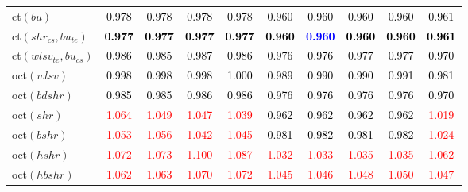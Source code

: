 \begin{tabular}[t]{>{\centering\arraybackslash}m{2.5cm}ccccccccc}
ct$(bu)$ & \textcolor{black}{0.978} & \textcolor{black}{0.978} & \textcolor{black}{0.978} & \textcolor{black}{0.978} & \textcolor{black}{0.960} & \textcolor{black}{0.960} & \textcolor{black}{0.960} & \textcolor{black}{0.960} & \textcolor{black}{0.961}\\
ct$(shr_{cs}, bu_{te})$ & \textcolor{black}{\textbf{0.977}} & \textcolor{black}{\textbf{0.977}} & \textcolor{black}{\textbf{0.977}} & \textcolor{black}{\textbf{0.977}} & \textcolor{black}{\textbf{0.960}} & \textcolor{blue}{\textbf{0.960}} & \textcolor{black}{\textbf{0.960}} & \textcolor{black}{\textbf{0.960}} & \textcolor{black}{\textbf{0.961}}\\
ct$(wlsv_{te}, bu_{cs})$ & \textcolor{black}{0.986} & \textcolor{black}{0.985} & \textcolor{black}{0.987} & \textcolor{black}{0.986} & \textcolor{black}{0.976} & \textcolor{black}{0.976} & \textcolor{black}{0.977} & \textcolor{black}{0.977} & \textcolor{black}{0.970}\\
oct$(wlsv)$ & \textcolor{black}{0.998} & \textcolor{black}{0.998} & \textcolor{black}{0.998} & \textcolor{black}{1.000} & \textcolor{black}{0.989} & \textcolor{black}{0.990} & \textcolor{black}{0.990} & \textcolor{black}{0.991} & \textcolor{black}{0.981}\\
oct$(bdshr)$ & \textcolor{black}{0.985} & \textcolor{black}{0.985} & \textcolor{black}{0.986} & \textcolor{black}{0.986} & \textcolor{black}{0.976} & \textcolor{black}{0.976} & \textcolor{black}{0.976} & \textcolor{black}{0.976} & \textcolor{black}{0.970}\\
oct$(shr)$ & \textcolor{red}{1.064} & \textcolor{red}{1.049} & \textcolor{red}{1.047} & \textcolor{red}{1.039} & \textcolor{black}{0.962} & \textcolor{black}{0.962} & \textcolor{black}{0.962} & \textcolor{black}{0.962} & \textcolor{red}{1.019}\\
oct$(bshr)$ & \textcolor{red}{1.053} & \textcolor{red}{1.056} & \textcolor{red}{1.042} & \textcolor{red}{1.045} & \textcolor{black}{0.981} & \textcolor{black}{0.982} & \textcolor{black}{0.981} & \textcolor{black}{0.982} & \textcolor{red}{1.024}\\
oct$(hshr)$ & \textcolor{red}{1.072} & \textcolor{red}{1.073} & \textcolor{red}{1.100} & \textcolor{red}{1.087} & \textcolor{red}{1.032} & \textcolor{red}{1.033} & \textcolor{red}{1.035} & \textcolor{red}{1.035} & \textcolor{red}{1.062}\\
oct$(hbshr)$ & \textcolor{red}{1.062} & \textcolor{red}{1.063} & \textcolor{red}{1.070} & \textcolor{red}{1.072} & \textcolor{red}{1.045} & \textcolor{red}{1.046} & \textcolor{red}{1.048} & \textcolor{red}{1.050} & \textcolor{red}{1.047}\\

\end{tabular}
